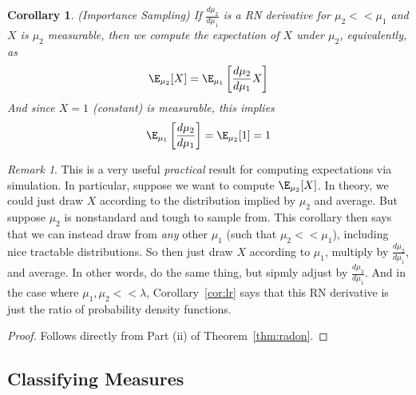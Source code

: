 \documentclass[12pt]{article}
\theoremstyle{plain}
\newtheorem{cor}[thm]{Corollary}
\theoremstyle{definition}
\theoremstyle{remark}
\newtheorem*{rmk}{Remark}
\begin{document}
\begin{cor}\emph{(Importance Sampling)}
\label{cor:importance}
If $\frac{d\mu_2}{d\mu_1}$ is a RN derivative for $\mu_2<<\mu_1$ and $X$
is $\mu_2$ measurable, then we compute the expectation of $X$ under
$\mu_2$, equivalently, as
\begin{align*}
  \E_{\mu_2}[X]
  =
  \E_{\mu_1}\left[\frac{d\mu_2}{d\mu_1}X\right]
\end{align*}
And since $X=1$ (constant) is measurable, this implies
\begin{align*}
  \E_{\mu_1}\left[\frac{d\mu_2}{d\mu_1}\right]
  =
  \E_{\mu_2}[1]
  = 1
\end{align*}
\end{cor}
\begin{rmk}
This is a very useful \emph{practical} result for computing expectations
via simulation. In particular, suppose we want to compute
$\E_{\mu_2}[X]$. In theory, we could just draw $X$ according to the
distribution implied by $\mu_2$ and average. But suppose $\mu_2$ is
nonstandard and tough to sample from. This corollary then says that we
can instead draw from \emph{any} other $\mu_1$ (such that
$\mu_2<<\mu_1$), including nice tractable distributions. So then just
draw $X$ according to $\mu_1$, multiply by $\frac{d\mu_2}{d\mu_1}$,
and average. In other words, do the same thing, but sipmly adjust by
$\frac{d\mu_2}{d\mu_1}$. And in the case where $\mu_1,\mu_2<<\lambda$,
Corollary~\ref{cor:lr} says that this RN derivative is just the ratio of
probability density functions.
\end{rmk}
\begin{proof}
Follows directly from Part (ii) of Theorem~\ref{thm:radon}.
\end{proof}




\clearpage
\subsection{Classifying Measures}
\end{document}
